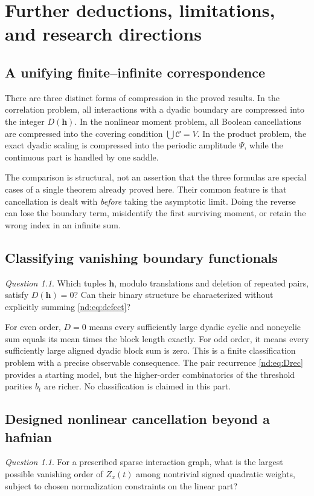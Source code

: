 \documentclass[11pt,a4paper,oneside,openany]{book}
\numberwithin{equation}{chapter}
\theoremstyle{definition}
\theoremstyle{remark}
\newtheorem{question}[theorem]{Question}
\newcommand{\CCov}{\mathcal C}
\begin{document}
\chapter{Further deductions, limitations, and research directions}
\label{nd:sec:frontiers}

\section{A unifying finite--infinite correspondence}
There are three distinct forms of compression in the proved results.
In the correlation problem, all interactions with a dyadic boundary are
compressed into the integer \(D(\bm h)\). In the nonlinear moment problem,
all Boolean cancellations are compressed into the covering condition
\(\bigcup\CCov=V\). In the product problem, the exact dyadic scaling is
compressed into the periodic amplitude \(\Psi\), while the continuous part
is handled by one saddle.

The comparison is structural, not an assertion that the three formulas are
special cases of a single theorem already proved here. Their common feature
is that cancellation is dealt with \emph{before} taking the asymptotic limit.
Doing the reverse can lose the boundary term, misidentify the first surviving
moment, or retain the wrong index in an infinite sum.

\section{Classifying vanishing boundary functionals}
\begin{question}
Which tuples \(\bm h\), modulo translations and deletion of repeated pairs,
satisfy \(D(\bm h)=0\)? Can their binary structure be characterized without
explicitly summing \eqref{nd:eq:defect}?
\end{question}

For even order, \(D=0\) means every sufficiently large dyadic cyclic and
noncyclic sum equals its mean times the block length exactly. For odd order,
it means every sufficiently large aligned dyadic block sum is zero. This is
a finite classification problem with a precise observable consequence.
The pair recurrence \eqref{nd:eq:Drec} provides a starting model, but the
higher-order combinatorics of the threshold parities \(b_t\) are richer.
No classification is claimed in this part.

\section{Designed nonlinear cancellation beyond a hafnian}
\begin{question}
For a prescribed sparse interaction graph, what is the largest possible
vanishing order of \(Z_x(t)\) among nontrivial signed quadratic weights,
subject to chosen normalization constraints on the linear part?
\end{question}
\end{document}
